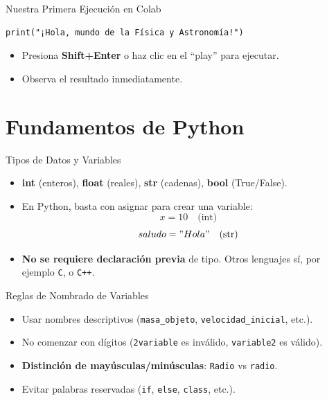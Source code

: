 \documentclass[10pt]{beamer}
\begin{document}
\begin{frame}[fragile]{Nuestra Primera Ejecución en Colab}
\begin{verbatim}
print("¡Hola, mundo de la Física y Astronomía!")
\end{verbatim}
\begin{itemize}
  \item Presiona \textbf{Shift+Enter} o haz clic en el “play” para ejecutar.
  \item Observa el resultado inmediatamente.
\end{itemize}
\end{frame}

\section{Fundamentos de Python}

\begin{frame}{Tipos de Datos y Variables}
  \begin{itemize}
    \item \textbf{int} (enteros), \textbf{float} (reales), \textbf{str} (cadenas), \textbf{bool} (True/False).
    \item En Python, basta con asignar para crear una variable:
          \[
            x = 10 \quad \text{(int)}
          \]
          \[
            saludo = "Hola" \quad \text{(str)}
          \]
    \item \textbf{No se requiere declaración previa} de tipo. Otros lenguajes sí, por ejemplo \texttt{C}, o \texttt{C++}.
  \end{itemize}
\end{frame}

\begin{frame}{Reglas de Nombrado de Variables}
  \begin{itemize}
    \item Usar nombres descriptivos (\texttt{masa\_objeto}, \texttt{velocidad\_inicial}, etc.).
    \item No comenzar con dígitos (\texttt{2variable} es inválido, \texttt{variable2} es válido).
    \item \textbf{Distinción de mayúsculas/minúsculas}: \texttt{Radio} vs \texttt{radio}.
    \item Evitar palabras reservadas (\texttt{if}, \texttt{else}, \texttt{class}, etc.).
  \end{itemize}
\end{frame}
\end{document}
